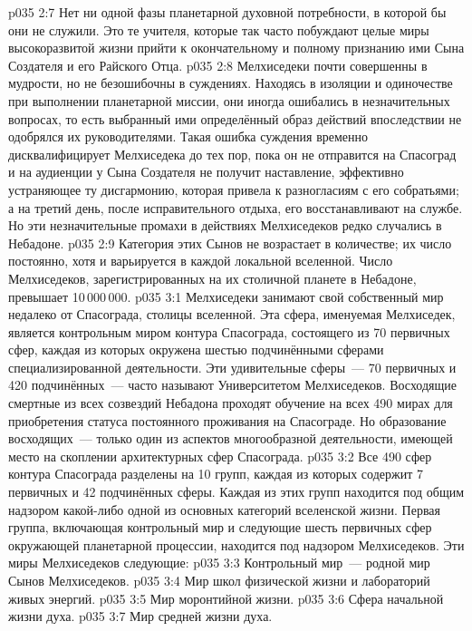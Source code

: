 \vs p035 2:7 Нет ни одной фазы планетарной духовной потребности, в которой бы они не служили. Это те учителя, которые так часто побуждают целые миры высокоразвитой жизни прийти к окончательному и полному признанию ими Сына Создателя и его Райского Отца.
\vs p035 2:8 \pc Мелхиседеки почти совершенны в мудрости, но не безошибочны в суждениях. Находясь в изоляции и одиночестве при выполнении планетарной миссии, они иногда ошибались в незначительных вопросах, то есть выбранный ими определённый образ действий впоследствии не одобрялся их руководителями. Такая ошибка суждения временно дисквалифицирует Мелхиседека до тех пор, пока он не отправится на Спасоград и на аудиенции у Сына Создателя не получит наставление, эффективно устраняющее ту дисгармонию, которая привела к разногласиям с его собратьями; а на третий день, после исправительного отдыха, его восстанавливают на службе. Но эти незначительные промахи в действиях Мелхиседеков редко случались в Небадоне.
\vs p035 2:9 Категория этих Сынов не возрастает в количестве; их число постоянно, хотя и варьируется в каждой локальной вселенной. Число Мелхиседеков, зарегистрированных на их столичной планете в Небадоне, превышает 10\,000\,000.
\vs p035 3:1 Мелхиседеки занимают свой собственный мир недалеко от Спасограда, столицы вселенной. Эта сфера, именуемая Мелхиседек, является контрольным миром контура Спасограда, состоящего из 70 первичных сфер, каждая из которых окружена шестью подчинёнными сферами специализированной деятельности. Эти удивительные сферы~--- 70 первичных и 420 подчинённых~--- часто называют Университетом Мелхиседеков. Восходящие смертные из всех созвездий Небадона проходят обучение на всех 490 мирах для приобретения статуса постоянного проживания на Спасограде. Но образование восходящих~--- только один из аспектов многообразной деятельности, имеющей место на скоплении архитектурных сфер Спасограда.
\vs p035 3:2 Все 490 сфер контура Спасограда разделены на 10 групп, каждая из которых содержит 7 первичных и 42 подчинённых сферы. Каждая из этих групп находится под общим надзором какой\hyp{}либо одной из основных категорий вселенской жизни. Первая группа, включающая контрольный мир и следующие шесть первичных сфер окружающей планетарной процессии, находится под надзором Мелхиседеков. Эти миры Мелхиседеков следующие:
\vs p035 3:3 Контрольный мир~--- родной мир Сынов Мелхиседеков.
\vs p035 3:4 Мир школ физической жизни и лабораторий живых энергий.
\vs p035 3:5 Мир моронтийной жизни.
\vs p035 3:6 Сфера начальной жизни духа.
\vs p035 3:7 Мир средней жизни духа.
